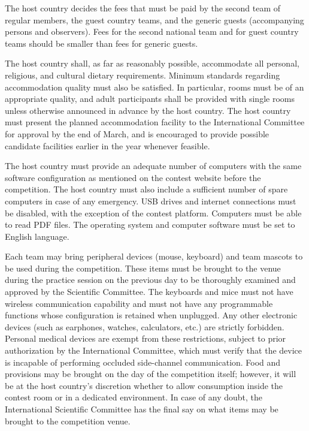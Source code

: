 \documentclass{article}
\begin{document}
The host country decides the fees that must be paid by the second team of regular members, the guest country teams, and the generic guests (accompanying persons and observers). Fees for the second national team and for guest country teams should be smaller than fees for generic guests. 

The host country shall, as far as reasonably possible, accommodate all personal, religious, and cultural dietary requirements.
Minimum standards regarding accommodation quality must also be satisfied. In particular, rooms must be of an appropriate quality, and adult participants shall be provided with single rooms unless otherwise announced in advance by the host country.
The host country must present the planned accommodation facility to the International Committee for approval by the end of March, and is encouraged to provide possible candidate facilities earlier in the year whenever feasible.


The host country must provide an adequate number of computers with the same software configuration as mentioned on the contest website before the competition. The host country must also include a sufficient number of spare computers in case of any emergency. USB drives and internet connections must be disabled, with the exception of the contest platform. Computers must be able to read PDF files. The operating system and computer software must be set to English language.

Each team may bring peripheral devices (mouse, keyboard) and team mascots to be used during the competition. These items must be brought to the venue during the practice session on the previous day to be thoroughly examined and approved by the Scientific Committee. The keyboards and mice must not have wireless communication capability and must not have any programmable functions whose configuration is retained when unplugged. Any other electronic devices (such as earphones, watches, calculators, etc.) are strictly forbidden. Personal medical devices are exempt from these restrictions, subject to prior authorization by the International Committee, which must verify that the device is incapable of performing occluded side-channel communication. Food and provisions may be brought on the day of the competition itself; however, it will be at the host country's discretion whether to allow consumption inside the contest room or in a dedicated environment. In case of any doubt, the International Scientific Committee has the final say on what items may be brought to the competition venue.
\end{document}
